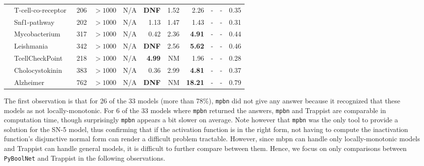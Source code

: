 \documentclass[preprint,12pt]{elsarticle}
\newcounter{rownumber}
\newcommand\rownb{\stepcounter{rownumber}\arabic{rownumber}}
\begin{document}
\begin{table}[!htb]
{\begin{tabular}{rlrrrrrrrrr}
    \midrule %
    \rownb & T-cell-co-receptor~\cite{DesignPrinciplesGeneNetworks} & 206 & $>1000$ & N/A & \textbf{DNF} & 1.52 & 2.26 & - & - & 0.35 \\
    \rownb & Snf1-pathway~\cite{Lubitz2015} & 202 & $>1000$ & N/A & 1.13 & 1.47 & 1.43 & - & - & 0.31 \\
    \rownb & Mycobacterium~\cite{DesignPrinciplesGeneNetworks} & 317 & $>1000$ & N/A & 0.42 & 2.36 & \textbf{4.91} & - & - & 0.44 \\
    \rownb & Leishmania~\cite{DesignPrinciplesGeneNetworks} & 342 & $>1000$ & N/A & \textbf{DNF} & 2.56 & \textbf{5.62} & - & - & 0.46 \\
    \rownb & TcellCheckPoint~\cite{hernandez2020computational} & 218 & $>1000$ & N/A & \textbf{4.99} & NM & 1.96 & - & - & 0.28 \\
    \rownb & Cholocystokinin~\cite{aghamiri2020automated} & 383 & $>1000$ & N/A & 0.36 & 2.99 & \textbf{4.81} & - & - & 0.37 \\
    \rownb & Alzheimer~\cite{aghamiri2020automated} & 762 & $>1000$ & N/A & \textbf{DNF} & NM & \textbf{18.21} & - & - & 0.79 \\
    
    \bottomrule
  \end{tabular}
  }
\end{table}

The first observation is that for 26 of the 33 models (more than 78\%), \texttt{mpbn} did not give any answer because it recognized that these models as not locally-monotonic.
For 6 of the 33 models where \texttt{mpbn} returned the answers, \texttt{mpbn} and Trappist are comparable in computation time, though surprisingly \texttt{mpbn} appears a bit slower on average.
Note however that \texttt{mpbn} was the only tool to provide a solution for the SN-5 model, thus confirming that if the activation function is in the right form, not having to compute the inactivation function's disjunctive normal form can render a difficult problem tractable.
However, since mbpn can handle only locally-monotonic models and Trappist can handle general models, it is difficult to further compare between them.
Hence, we focus on only comparisons between \texttt{PyBoolNet} and Trappist in the following observations.
\end{document}
